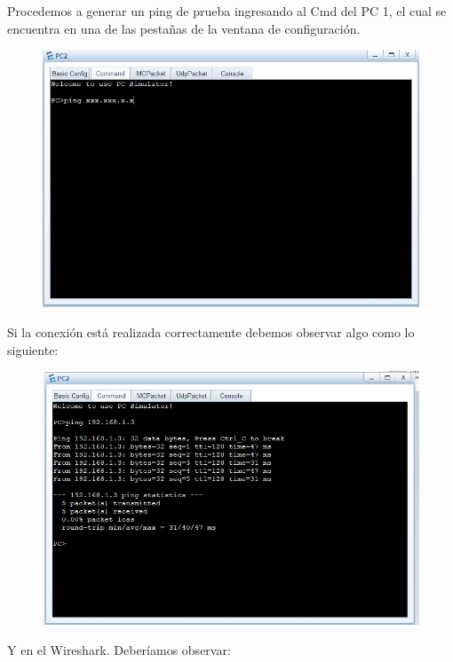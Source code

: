 \documentclass[journal]{IEEEtran}
\begin{document}
Procedemos a generar un ping de prueba ingresando al Cmd del PC 1, el cual se encuentra en una de las pestañas de la ventana de configuración.
\begin{center}
\begin{figure}[H]
\centering
\includegraphics[scale=0.45]{12,5.JPG} 
\end{figure}
\end{center}
Si la conexión está realizada correctamente debemos observar algo como lo siguiente:
\begin{center}
\begin{figure}[H]
\centering
\includegraphics[scale=0.45]{12.JPG} 
\end{figure}
\end{center}
Y en el  Wireshark. Deberíamos observar:
\end{document}
